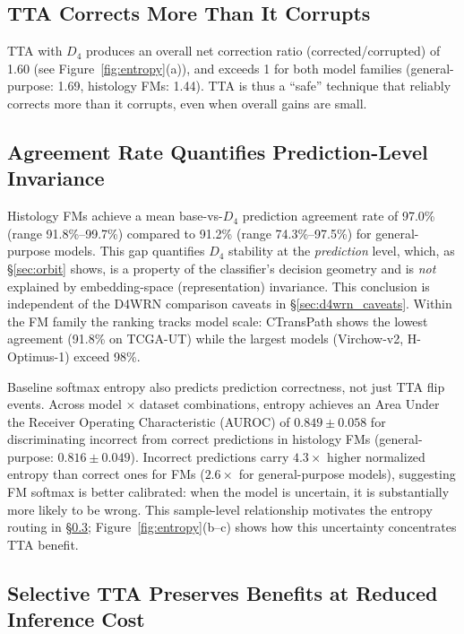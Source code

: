 \documentclass{melba}
\begin{document}
\subsection{TTA Corrects More Than It Corrupts}

TTA with $D_4$ produces an overall net correction ratio (corrected/corrupted) of 1.60 (see Figure~\ref{fig:entropy}(a)), and exceeds 1 for both model families (general-purpose: 1.69, histology FMs: 1.44). TTA is thus a ``safe'' technique that reliably corrects more than it corrupts, even when overall gains are small.


\subsection{Agreement Rate Quantifies Prediction-Level Invariance}
\label{sec:agreement}

Histology FMs achieve a mean base-vs-$D_4$ prediction agreement rate of 97.0\% (range 91.8\%--99.7\%) compared to 91.2\% (range 74.3\%--97.5\%) for general-purpose models. This gap quantifies $D_4$ stability at the \emph{prediction} level, which, as \S\ref{sec:orbit} shows, is a property of the classifier's decision geometry and is \emph{not} explained by embedding-space (representation) invariance. This conclusion is independent of the D4WRN comparison caveats in \S\ref{sec:d4wrn_caveats}. Within the FM family the ranking tracks model scale: CTransPath shows the lowest agreement (91.8\% on TCGA-UT) while the largest models (Virchow-v2, H-Optimus-1) exceed 98\%.

Baseline softmax entropy also predicts prediction correctness, not just TTA flip events. Across model $\times$ dataset combinations, entropy achieves an Area Under the Receiver Operating Characteristic (AUROC) of $0.849 \pm 0.058$ for discriminating incorrect from correct predictions in histology FMs (general-purpose: $0.816 \pm 0.049$). Incorrect predictions carry $4.3\times$ higher normalized entropy than correct ones for FMs ($2.6\times$ for general-purpose models), suggesting FM softmax is better calibrated: when the model is uncertain, it is substantially more likely to be wrong. This sample-level relationship motivates the entropy routing in \S\ref{sec:selective}; Figure~\ref{fig:entropy}(b--c) shows how this uncertainty concentrates TTA benefit.


\subsection{Selective TTA Preserves Benefits at Reduced Inference Cost}
\label{sec:selective}
\end{document}
